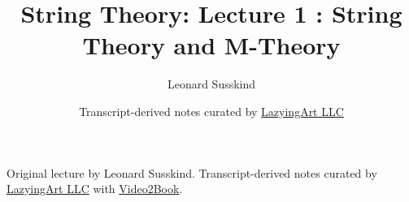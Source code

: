 \documentclass[11pt,oneside]{book}
\begin{document}
\frontmatter
\title{String Theory: Lecture 1 : String Theory and M-Theory}
\author{Leonard Susskind}
\date{Transcript-derived notes curated by \href{https://lazying.art}{LazyingArt LLC}}
\maketitle
\begin{center}
\small Original lecture by Leonard Susskind. Transcript-derived notes curated by \href{https://lazying.art}{LazyingArt LLC} with \href{https://github.com/lachlanchen/Video2Book}{Video2Book}.
\end{center}
\clearpage
\mainmatter

\end{document}
